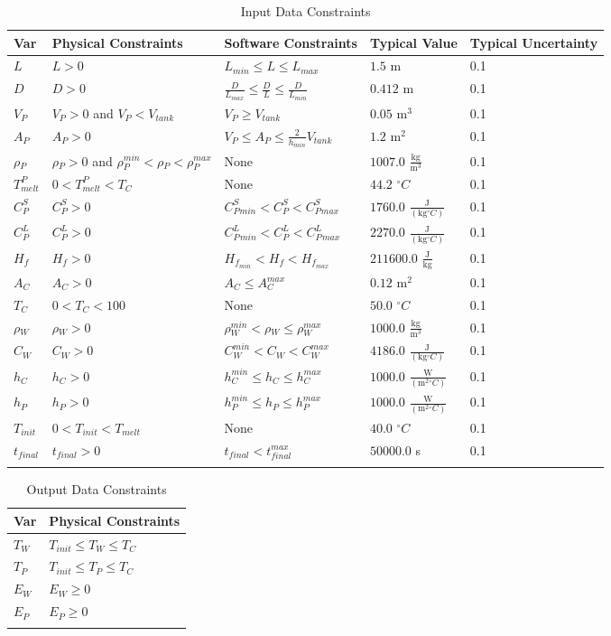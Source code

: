 \documentclass[12pt]{article}
\begin{document}
\begin{longtable}{l l l l l}
\toprule
Var & Physical Constraints & Software Constraints & Typical Value & Typical Uncertainty
\\
\midrule
$L$ & $L>0$ & $L_{min}\leq{}L\leq{}L_{max}$ & $1.5$ m & 0.1
\\
$D$ & $D>0$ & $\frac{D}{L_{max}}\leq{}\frac{D}{L}\leq{}\frac{D}{L_{min}}$ & $0.412$ m & 0.1
\\
$V_{P}$ & $V_{P}>0$ and $V_{P}<V_{tank}$ & $V_{P}\geq{}V_{tank}$ & $0.05$ $\text{m}^{3}$ & 0.1
\\
$A_{P}$ & $A_{P}>0$ & $V_{P}\leq{}A_{P}\leq{}\frac{2}{h_{min}}V_{tank}$ & $1.2$ $\text{m}^{2}$ & 0.1
\\
$\rho{}_{P}$ & $\rho{}_{P}>0$ and $\rho{}_{P}^{min}<\rho{}_{P}<\rho{}_{P}^{max}$ & None & $1007.0$ $\frac{\text{kg}}{\text{m}^{3}}$ & 0.1
\\
$T_{melt}^{P}$ & $0<T_{melt}^{P}<T_{C}$ & None & $44.2$ ${}^{\circ}C$ & 0.1
\\
$C_{P}^{S}$ & $C_{P}^{S}>0$ & $C_{P}^{S}_{min}<C_{P}^{S}<C_{P}^{S}_{max}$ & $1760.0$ $\frac{\text{J}}{(\text{kg}{}^{\circ}C)}$ & 0.1
\\
$C_{P}^{L}$ & $C_{P}^{L}>0$ & $C_{P}^{L}_{min}<C_{P}^{L}<C_{P}^{L}_{max}$ & $2270.0$ $\frac{\text{J}}{(\text{kg}{}^{\circ}C)}$ & 0.1
\\
$H_{f}$ & $H_{f}>0$ & $H_{f}_{min}<H_{f}<H_{f}_{max}$ & $211600.0$ $\frac{\text{J}}{\text{kg}}$ & 0.1
\\
$A_{C}$ & $A_{C}>0$ & $A_{C}\leq{}A_{C}^{max}$ & $0.12$ $\text{m}^{2}$ & 0.1
\\
$T_{C}$ & $0<T_{C}<100$ & None & $50.0$ ${}^{\circ}C$ & 0.1
\\
$\rho{}_{W}$ & $\rho{}_{W}>0$ & $\rho{}_{W}^{min}<\rho{}_{W}\leq{}\rho{}_{W}^{max}$ & $1000.0$ $\frac{\text{kg}}{\text{m}^{3}}$ & 0.1
\\
$C_{W}$ & $C_{W}>0$ & $C_{W}^{min}<C_{W}<C_{W}^{max}$ & $4186.0$ $\frac{\text{J}}{(\text{kg}{}^{\circ}C)}$ & 0.1
\\
$h_{C}$ & $h_{C}>0$ & $h_{C}^{min}\leq{}h_{C}\leq{}h_{C}^{max}$ & $1000.0$ $\frac{\text{W}}{(\text{m}^{2}{}^{\circ}C)}$ & 0.1
\\
$h_{P}$ & $h_{P}>0$ & $h_{P}^{min}\leq{}h_{P}\leq{}h_{P}^{max}$ & $1000.0$ $\frac{\text{W}}{(\text{m}^{2}{}^{\circ}C)}$ & 0.1
\\
$T_{init}$ & $0<T_{init}<T_{melt}$ & None & $40.0$ ${}^{\circ}C$ & 0.1
\\
$t_{final}$ & $t_{final}>0$ & $t_{final}<t_{final}^{max}$ & $50000.0$ s & 0.1
\\
\bottomrule
\caption{Input Data Constraints}
\label{Table:InpuDataCons}
\end{longtable}
\begin{longtable}{l l}
\toprule
Var & Physical Constraints
\\
\midrule
$T_{W}$ & $T_{init}\leq{}T_{W}\leq{}T_{C}$
\\
$T_{P}$ & $T_{init}\leq{}T_{P}\leq{}T_{C}$
\\
$E_{W}$ & $E_{W}\geq{}0$
\\
$E_{P}$ & $E_{P}\geq{}0$
\\
\bottomrule
\caption{Output Data Constraints}
\label{Table:OutpDataCons}
\end{longtable}
\end{document}
